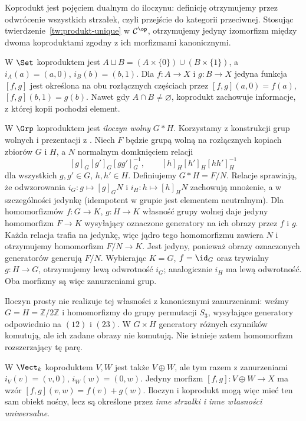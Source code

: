 Koprodukt jest pojęciem dualnym do iloczynu: definicję otrzymujemy przez odwrócenie wszystkich strzałek, czyli przejście do kategorii przeciwnej. Stosując twierdzenie~\ref{tw:produkt-unique} w $\mathcal C^{\op}$, otrzymujemy jedyny izomorfizm między dwoma koproduktami zgodny z ich morfizmami kanonicznymi.

\begin{przyklad}
W $\Set$ koproduktem jest $A\sqcup B=(A\times\{0\})\cup(B\times\{1\})$, a $i_A(a)=(a,0)$, $i_B(b)=(b,1)$. Dla $f:A\to X$ i $g:B\to X$ jedyna funkcja $[f,g]$ jest określona na obu rozłącznych częściach przez $[f,g](a,0)=f(a)$, $[f,g](b,1)=g(b)$. Nawet gdy $A\cap B\neq\varnothing$, koprodukt zachowuje informacje, z której kopii pochodzi element.
\end{przyklad}

\begin{przyklad}
W $\Grp$ koproduktem jest \emph{iloczyn wolny} $G*H$. Korzystamy z konstrukcji grup wolnych i prezentacji z . Niech $F$ będzie grupą wolną na rozłącznych kopiach zbiorów $G$ i $H$, a $N$ normalnym domknięciem relacji
\[
[g]_G[g']_G[gg']_G^{-1},\qquad
[h]_H[h']_H[hh']_H^{-1}
\]
dla wszystkich $g,g'\in G$, $h,h'\in H$. Definiujemy $G*H=F/N$. Relacje sprawiają, że odwzorowania $i_G:g\mapsto[g]_GN$ i $i_H:h\mapsto[h]_HN$ zachowują mnożenie, a w szczególności jedynkę (idempotent w grupie jest elementem neutralnym). Dla homomorfizmów $f:G\to K$, $g:H\to K$ własność grupy wolnej daje jedyny homomorfizm $F\to K$ wysyłający oznaczone generatory na ich obrazy przez $f$ i $g$. Każda relacja trafia na jedynkę, więc jądro tego homomorfizmu zawiera $N$ i otrzymujemy homomorfizm $F/N\to K$. Jest jedyny, ponieważ obrazy oznaczonych generatorów generują $F/N$. Wybierając $K=G$, $f=\id_G$ oraz trywialny $g:H\to G$, otrzymujemy lewą odwrotność $i_G$; analogicznie $i_H$ ma lewą odwrotność. Oba morfizmy są więc zanurzeniami grup.

Iloczyn prosty nie realizuje tej własności z kanonicznymi zanurzeniami: weźmy $G=H=\mathbb Z/2\mathbb Z$ i homomorfizmy do grupy permutacji $S_3$, wysyłające generatory odpowiednio na $(12)$ i $(23)$. W $G\times H$ generatory różnych czynników komutują, ale ich zadane obrazy nie komutują. Nie istnieje zatem homomorfizm rozszerzający tę parę.
\end{przyklad}

\begin{przyklad}
W $\Vect_k$ koproduktem $V,W$ jest także $V\oplus W$, ale tym razem z zanurzeniami $i_V(v)=(v,0)$, $i_W(w)=(0,w)$. Jedyny morfizm $[f,g]:V\oplus W\to X$ ma wzór $[f,g](v,w)=f(v)+g(w)$. Iloczyn i koprodukt mogą więc mieć ten sam obiekt nośny, lecz są określone przez \emph{inne strzałki i inne własności uniwersalne}.
\end{przyklad}

